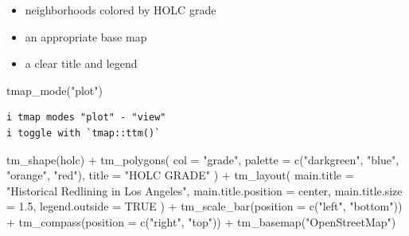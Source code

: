 \documentclass[
  letterpaper,
  DIV=11,
  numbers=noendperiod]{scrartcl}
\newenvironment{Shaded}{\begin{snugshade}}{\end{snugshade}}
\newcommand{\AttributeTok}[1]{\textcolor[rgb]{0.40,0.45,0.13}{#1}}
\newcommand{\ConstantTok}[1]{\textcolor[rgb]{0.56,0.35,0.01}{#1}}
\newcommand{\FloatTok}[1]{\textcolor[rgb]{0.68,0.00,0.00}{#1}}
\newcommand{\FunctionTok}[1]{\textcolor[rgb]{0.28,0.35,0.67}{#1}}
\newcommand{\NormalTok}[1]{\textcolor[rgb]{0.00,0.23,0.31}{#1}}
\newcommand{\SpecialCharTok}[1]{\textcolor[rgb]{0.37,0.37,0.37}{#1}}
\newcommand{\StringTok}[1]{\textcolor[rgb]{0.13,0.47,0.30}{#1}}
\providecommand{\tightlist}{%
  \setlength{\itemsep}{0pt}\setlength{\parskip}{0pt}}\usepackage{longtable,booktabs,array}
\begin{document}
\begin{itemize}
\tightlist
\item
  neighborhoods colored by HOLC grade
\item
  an appropriate base map
\item
  a clear title and legend
\end{itemize}

\begin{Shaded}
\begin{Highlighting}[]
\FunctionTok{tmap\_mode}\NormalTok{(}\StringTok{"plot"}\NormalTok{)}
\end{Highlighting}
\end{Shaded}

\begin{verbatim}
i tmap modes "plot" - "view"
i toggle with `tmap::ttm()`
\end{verbatim}

\begin{Shaded}
\begin{Highlighting}[]
\FunctionTok{tm\_shape}\NormalTok{(holc) }\SpecialCharTok{+}
  \FunctionTok{tm\_polygons}\NormalTok{(}
    \AttributeTok{col =} \StringTok{"grade"}\NormalTok{,}
    \AttributeTok{palette =} \FunctionTok{c}\NormalTok{(}\StringTok{"darkgreen"}\NormalTok{, }\StringTok{"blue"}\NormalTok{, }\StringTok{"orange"}\NormalTok{, }\StringTok{"red"}\NormalTok{),}
    \AttributeTok{title =} \StringTok{"HOLC GRADE"}
\NormalTok{  ) }\SpecialCharTok{+}
  \FunctionTok{tm\_layout}\NormalTok{(}
    \AttributeTok{main.title =} \StringTok{"Historical Redlining in Los Angeles"}\NormalTok{,}
    \AttributeTok{main.title.position =} \StringTok{\textquotesingle{}center\textquotesingle{}}\NormalTok{,}
    \AttributeTok{main.title.size =} \FloatTok{1.5}\NormalTok{,}
    \AttributeTok{legend.outside =} \ConstantTok{TRUE}
\NormalTok{  ) }\SpecialCharTok{+} 
  \FunctionTok{tm\_scale\_bar}\NormalTok{(}\AttributeTok{position =} \FunctionTok{c}\NormalTok{(}\StringTok{"left"}\NormalTok{, }\StringTok{"bottom"}\NormalTok{)) }\SpecialCharTok{+}
  \FunctionTok{tm\_compass}\NormalTok{(}\AttributeTok{position =} \FunctionTok{c}\NormalTok{(}\StringTok{"right"}\NormalTok{, }\StringTok{"top"}\NormalTok{)) }\SpecialCharTok{+}
  \FunctionTok{tm\_basemap}\NormalTok{(}\StringTok{"OpenStreetMap"}\NormalTok{) }
\end{Highlighting}
\end{Shaded}
\end{document}
